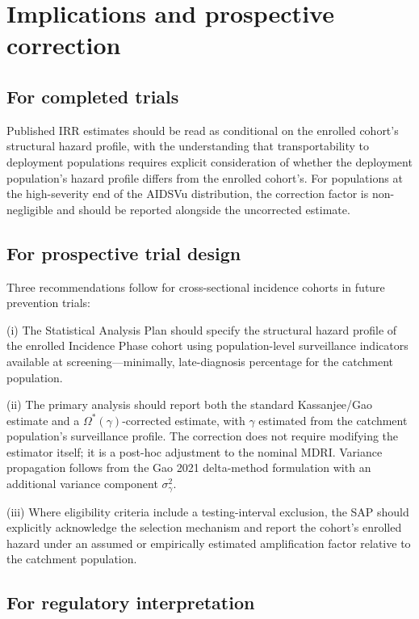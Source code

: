 \documentclass[11pt]{article}
\begin{document}
\section{Implications and prospective correction}

\subsection{For completed trials}

Published IRR estimates should be read as conditional on the enrolled cohort's structural hazard profile, with the understanding that transportability to deployment populations requires explicit consideration of whether the deployment population's hazard profile differs from the enrolled cohort's. For populations at the high-severity end of the AIDSVu distribution, the correction factor is non-negligible and should be reported alongside the uncorrected estimate.

\subsection{For prospective trial design}

Three recommendations follow for cross-sectional incidence cohorts in future prevention trials:

(i) The Statistical Analysis Plan should specify the structural hazard profile of the enrolled Incidence Phase cohort using population-level surveillance indicators available at screening---minimally, late-diagnosis percentage for the catchment population.

(ii) The primary analysis should report both the standard Kassanjee/Gao estimate and a $\Omega^*(\gamma)$-corrected estimate, with $\gamma$ estimated from the catchment population's surveillance profile. The correction does not require modifying the estimator itself; it is a post-hoc adjustment to the nominal MDRI. Variance propagation follows from the Gao 2021 delta-method formulation with an additional variance component $\sigma^2_\gamma$.

(iii) Where eligibility criteria include a testing-interval exclusion, the SAP should explicitly acknowledge the selection mechanism and report the cohort's enrolled hazard under an assumed or empirically estimated amplification factor relative to the catchment population.

\subsection{For regulatory interpretation}
\end{document}
